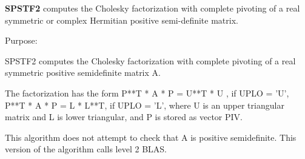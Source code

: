 {\bfseries S\+P\+S\+T\+F2} computes the Cholesky factorization with complete pivoting of a real symmetric or complex Hermitian positive semi-\/definite matrix. 

 \begin{DoxyParagraph}{Purpose\+: }
\begin{DoxyVerb} SPSTF2 computes the Cholesky factorization with complete
 pivoting of a real symmetric positive semidefinite matrix A.

 The factorization has the form
    P**T * A * P = U**T * U ,  if UPLO = 'U',
    P**T * A * P = L  * L**T,  if UPLO = 'L',
 where U is an upper triangular matrix and L is lower triangular, and
 P is stored as vector PIV.

 This algorithm does not attempt to check that A is positive
 semidefinite. This version of the algorithm calls level 2 BLAS.\end{DoxyVerb}
 
\end{DoxyParagraph}

